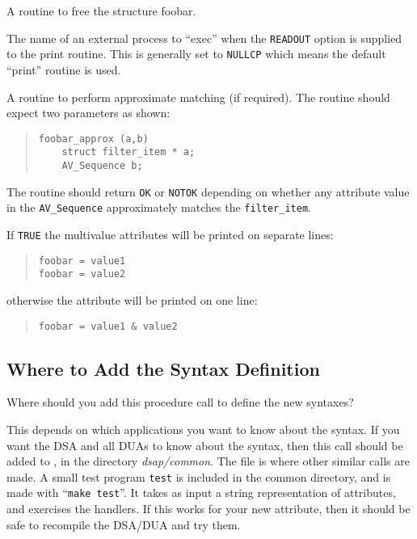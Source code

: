 \begin{describe}
\item[\verb"sfree":] A routine to free the structure foobar.

\item[\verb"print\_pe":] The name of an external process to ``exec'' when the
\verb+READOUT+ option is supplied to the print routine.
This is generally set to \verb+NULLCP+ which means the default ``print''
routine is used.

\item[\verb"approx":] A routine to perform approximate matching (if
required).
The routine should expect two parameters as shown:
\begin{quote}\begin{verbatim}
foobar_approx (a,b)
    struct filter_item * a;
    AV_Sequence b;
\end{verbatim}\end{quote}
The routine should return \verb+OK+ or \verb+NOTOK+ depending on whether 
any attribute value in the \verb+AV_Sequence+ approximately matches the 
\verb+filter_item+.

\item[\verb"multiline":] If \verb"TRUE" the multivalue attributes will be
printed on separate lines:
\begin{quote}\small\begin{verbatim}
foobar = value1
foobar = value2
\end{verbatim}\end{quote}
otherwise the attribute will be printed on one
line:
\begin{quote}\small\begin{verbatim}
foobar = value1 & value2
\end{verbatim}\end{quote}

\end{describe}

\subsection {Where to Add the Syntax Definition}

Where should you add this procedure call to define the new syntaxes?

This depends on which applications you want to know about the syntax.
If you want the DSA and all DUAs to know about the syntax, then this call
should be added to , in the directory {\em dsap/common}.
The file
 is where other similar calls are made.
A small test program \verb"test" is included in the common directory, and is
made with ``\verb+make test+''.  It takes as input a string representation of
attributes, and exercises the handlers.
If this works for your new attribute, then it should be safe to recompile the
DSA/DUA and try them.

